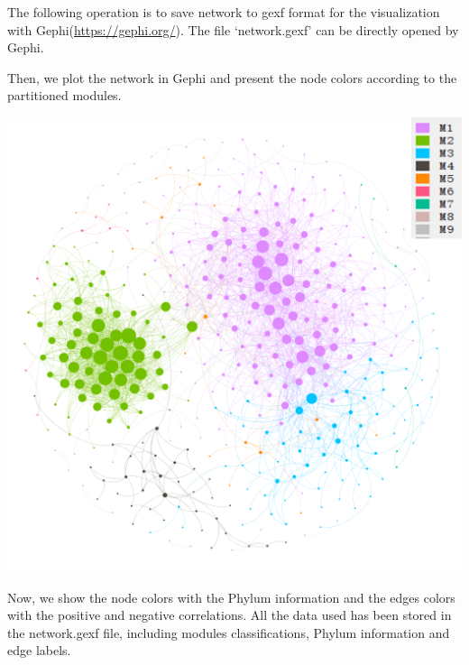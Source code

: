 \documentclass[
]{book}
\newenvironment{Shaded}{\begin{snugshade}}{\end{snugshade}}
\newcommand{\AttributeTok}[1]{\textcolor[rgb]{0.77,0.63,0.00}{#1}}
\newcommand{\CommentTok}[1]{\textcolor[rgb]{0.56,0.35,0.01}{\textit{#1}}}
\newcommand{\FunctionTok}[1]{\textcolor[rgb]{0.00,0.00,0.00}{#1}}
\newcommand{\NormalTok}[1]{#1}
\newcommand{\SpecialCharTok}[1]{\textcolor[rgb]{0.00,0.00,0.00}{#1}}
\newcommand{\StringTok}[1]{\textcolor[rgb]{0.31,0.60,0.02}{#1}}
\begin{document}
The following operation is to save network to gexf format for the visualization with Gephi(\url{https://gephi.org/}).
The file `network.gexf' can be directly opened by Gephi.

\begin{Shaded}
\end{Shaded}

Then, we plot the network in Gephi and present the node colors according to the partitioned modules.

\begin{center}\includegraphics[width=550px]{Images/network1_spearman} \end{center}

Now, we show the node colors with the Phylum information and the edges colors with the positive and negative correlations.
All the data used has been stored in the network.gexf file, including modules classifications, Phylum information and edge labels.
\end{document}
